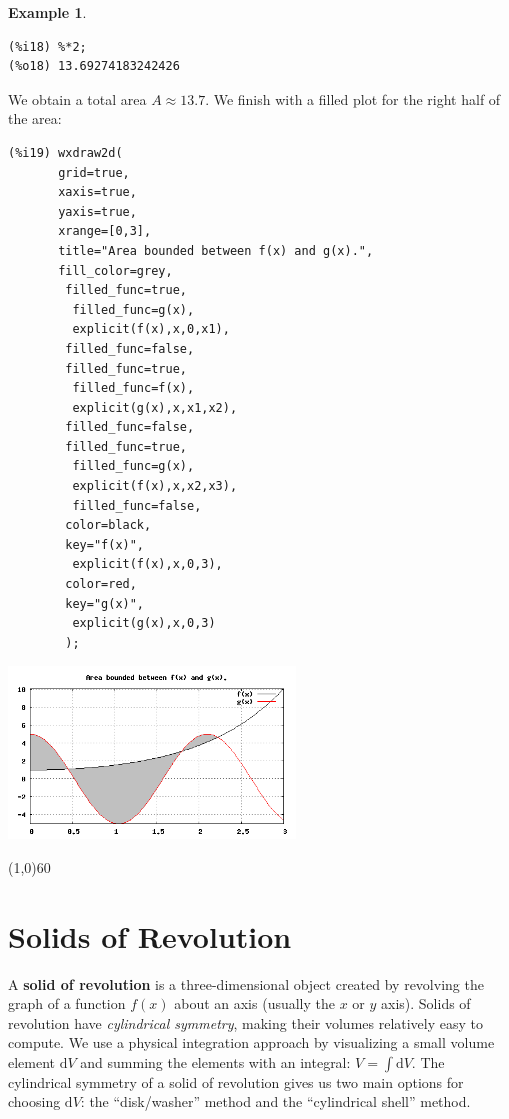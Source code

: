 \documentclass[10.5pt,twoside]{report}
\theoremstyle{definition}
\newtheorem{exmp}{Example}[section]
\begin{document}
\begin{exmp}
\begin{verbatim}
(%i18) %*2;
(%o18) 13.69274183242426
\end{verbatim}

We obtain a total area $A\approx 13.7$.  We finish with a filled plot for the right half of the area:


\begin{verbatim}
(%i19) wxdraw2d(
       grid=true,
       xaxis=true,
       yaxis=true,
       xrange=[0,3],
       title="Area bounded between f(x) and g(x).",
       fill_color=grey,
        filled_func=true,
         filled_func=g(x),
         explicit(f(x),x,0,x1),
        filled_func=false,
        filled_func=true,
         filled_func=f(x),
         explicit(g(x),x,x1,x2),
        filled_func=false,
        filled_func=true,
         filled_func=g(x),
         explicit(f(x),x,x2,x3),
         filled_func=false,
        color=black,
        key="f(x)",
         explicit(f(x),x,0,3),
        color=red,
        key="g(x)",
         explicit(g(x),x,0,3)
        );
\end{verbatim}

\includegraphics[width=3in]{example_3_1_3_2}

\end{exmp}

\line(1,0){60}
\linethickness{0.5mm}

\pagebreak








\pagebreak
\section{Solids of Revolution}\label{Solids of Revolution}

A \textbf{solid of revolution} is a three-dimensional object created by revolving the graph of a function $f(x)$ about an axis (usually the $x$ or $y$ axis). Solids of revolution have \textit{cylindrical symmetry}, making their volumes relatively easy to compute.  We use a physical integration approach by visualizing a small volume element $\mathrm{d}V$ and summing the elements with an integral:  $V=\displaystyle \int \mathrm{d}V$.  The cylindrical symmetry of a solid of revolution gives us two main options for choosing $\mathrm{d}V$:  the ``disk/washer'' method and the ``cylindrical shell'' method. \\
\end{document}
